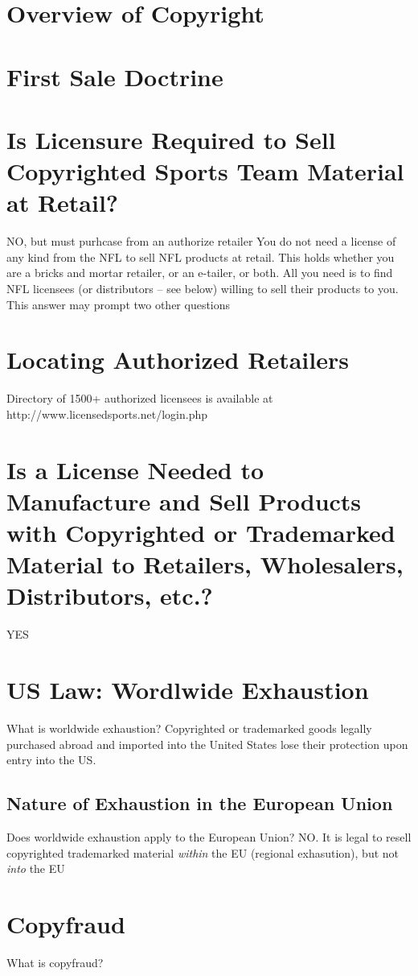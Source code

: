 \documentclass[letterpaper,11pt]{texMemo}
\begin{document}
\section{Overview of Copyright}
\section{First Sale Doctrine}
\section{Is Licensure Required to Sell Copyrighted Sports Team Material at Retail?}
	NO, but must purhcase from an authorize retailer
		You do not need a license of any kind from the NFL to sell NFL products at retail. This holds whether you are a bricks and mortar retailer, or an e-tailer, or both. All you need is to find NFL licensees (or distributors – see below) willing to sell their products to you. This answer may prompt two other questions
\section{Locating Authorized Retailers}
	Directory of 1500+ authorized licensees is available at http://www.licensedsports.net/login.php
\section{Is a License Needed to Manufacture and Sell Products with Copyrighted or Trademarked Material to Retailers, Wholesalers, Distributors, etc.?}
  YES
\section{US Law: Wordlwide Exhaustion}
What is worldwide exhaustion?
	Copyrighted or trademarked goods legally purchased abroad and imported into the United States lose their protection upon entry into the US.
  \subsection{Nature of Exhaustion in the European Union}
  Does worldwide exhaustion apply to the European Union?
	NO. It is legal to resell copyrighted trademarked material \emph{within} the EU (regional exhasution), but not \emph{into} the EU
\section{Copyfraud}
  What is copyfraud?
\end{document}
